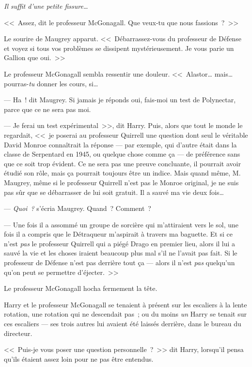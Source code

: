 \emph{Il suffit d'une petite fissure…}

<<~Assez, dit le professeur McGonagall. Que veux-tu que nous fassions~?~>>

Le sourire de Maugrey apparut. <<~Débarrassez-vous du professeur de Défense et voyez si tous vos problèmes se dissipent mystérieusement. Je vous parie un Gallion que oui.~>>

Le professeur McGonagall sembla ressentir une douleur.
<<~Alastor… mais… pourras-\emph{tu} donner les cours, si…

--- Ha~! dit Maugrey. Si jamais je réponds oui, fais-moi un test de Polynectar, parce que ce ne sera pas moi.

--- Je ferai un test expérimental~>>, dit Harry. Puis, alors que tout le monde le regardait, <<~je poserai au professeur Quirrell une question dont seul le véritable David Monroe connaîtrait la réponse — par exemple, qui d'autre était dans la classe de Serpentard en 1945, ou quelque chose comme ça — de préférence sans que ce soit trop évident. Ce ne sera pas une preuve concluante, il pourrait avoir étudié son rôle, mais ça pourrait toujours être un indice. Mais quand même, M. Maugrey, même si le professeur Quirrell n'est pas le Monroe original, je ne suis pas sûr que se débarrasser de lui soit gratuit. Il a sauvé ma vie deux fois…

--- \emph{Quoi~?} s'écria Maugrey. Quand~? Comment~?

--- Une fois il a assommé un groupe de sorcière qui m'attiraient vers le sol, une fois il a compris que le Détraqueur m'aspirait à travers ma baguette. Et si ce n'est \emph{pas} le professeur Quirrell qui a piégé Drago en premier lieu, alors il lui a sauvé la vie et les choses iraient beaucoup plus mal s'il ne l'avait pas fait. Si le professeur de Défense n'est pas derrière tout ça — alors il n'est \emph{pas} quelqu'un qu'on peut se permettre d'éjecter.~>>

Le professeur McGonagall hocha fermement la tête.


Harry et le professeur McGonagall se tenaient à présent sur les escaliers à la lente rotation, une rotation qui ne descendait pas~; ou du moins \emph{un} Harry se tenait sur ces escaliers — ses trois autres lui avaient été laissés derrière, dans le bureau du directeur.

<<~Puis-je vous poser une question personnelle~?~>> dit Harry, lorsqu'il pensa qu'ils étaient assez loin pour ne pas être entendus.

